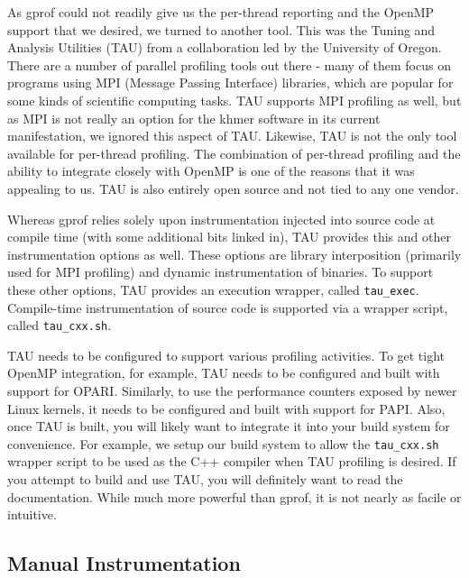 \documentclass{article}
\begin{document}
As gprof could not readily give us the per-thread reporting and the OpenMP
support that we desired, we turned to another tool. This was the Tuning and
Analysis Utilities (TAU) \citep{web:TAU} from a collaboration led by the
University of Oregon. There are a number of parallel profiling tools out there
- many of them focus on programs using MPI (Message Passing Interface)
libraries, which are popular for some kinds of scientific computing tasks. TAU
supports MPI profiling as well, but as MPI is not really an option for the
khmer software in its current manifestation, we ignored this aspect of TAU.
Likewise, TAU is not the only tool available for per-thread profiling. The
combination of per-thread profiling and the ability to integrate closely with
OpenMP is one of the reasons that it was appealing to us. TAU is also entirely
open source and not tied to any one vendor.

Whereas gprof relies solely upon instrumentation injected into source code at
compile time (with some additional bits linked in), TAU provides this and other
instrumentation options as well. These options are library interposition
(primarily used for MPI profiling) and dynamic instrumentation of binaries. To
support these other options, TAU provides an execution wrapper, called
\texttt{tau\_exec}. Compile-time instrumentation of source code is supported
via a wrapper script, called \texttt{tau\_cxx.sh}.

TAU needs to be configured to support various profiling activities.
To get tight OpenMP integration, for example, TAU needs to be
configured and built with support for OPARI. Similarly, to use the
performance counters exposed by newer Linux kernels, it needs to be
configured and built with support for PAPI. Also, once TAU is built,
you will likely want to integrate it into your build system for
convenience. For example, we setup our build system to allow the
\texttt{tau\_cxx.sh} wrapper script to be used as the C++ compiler
when TAU profiling is desired. If you attempt to build and use TAU,
you will definitely want to read the documentation. While much more
powerful than gprof, it is not nearly as facile or intuitive.

\subsection{Manual Instrumentation}

\end{document}
